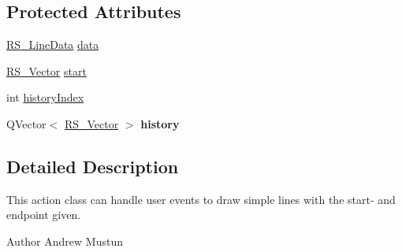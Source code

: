 \subsection*{Protected Attributes}
\begin{DoxyCompactItemize}
\item 
\hyperlink{classRS__LineData}{R\-S\-\_\-\-Line\-Data} \hyperlink{classRS__ActionDrawLine_afb8e840ac7a66f7f0126a41173fe157c}{data}
\item 
\hyperlink{classRS__Vector}{R\-S\-\_\-\-Vector} \hyperlink{classRS__ActionDrawLine_a436f4df5955d62ba44f3702c371928d4}{start}
\item 
int \hyperlink{classRS__ActionDrawLine_ac576f41472eeaee9d60a0b71aa301bbf}{history\-Index}
\item 
\hypertarget{classRS__ActionDrawLine_abab8f12381aa4bee811be1ea4e6b2d87}{Q\-Vector$<$ \hyperlink{classRS__Vector}{R\-S\-\_\-\-Vector} $>$ {\bfseries history}}\label{classRS__ActionDrawLine_abab8f12381aa4bee811be1ea4e6b2d87}

\end{DoxyCompactItemize}


\subsection{Detailed Description}
This action class can handle user events to draw simple lines with the start-\/ and endpoint given.

\begin{DoxyAuthor}{Author}
Andrew Mustun 
\end{DoxyAuthor}



